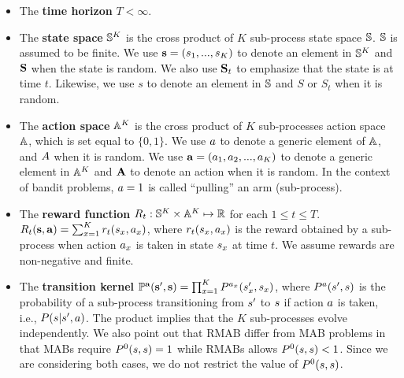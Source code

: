 \begin{itemize}
\item The \textbf{time horizon} $T<\infty$.

\item The \textbf{state space} $\mathbb{S}^K$ is the cross product of $K$ sub-process state space $\mathbb{S}$. $\mathbb{S}$ is assumed to be finite. We use $\mathbf{s}=(s_1,...,s_K)$ to denote an element in $\mathbb{S}^K$ and $\mathbf{S}$ when the state is random. We also use $\mathbf{S}_t$ to emphasize that the state is at time $t$. 
Likewise, we use $s$ to denote an element in $\mathbb{S}$ and $S$ or $S_t$ when it is random. 

\item The \textbf{action space} $\mathbb{A}^K$ is the cross product of $K$ sub-processes action space $\mathbb{A}$, which is set equal to $\{0,1\}$. We use $a$ to denote a generic element of $\mathbb{A}$, and $A$ when it is random. We use $\mathbf{a}=(a_1,a_2,...,a_K)$ to denote a generic element in $\mathbb{A}^K$ and $\mathbf{A}$ to denote an action when it is random. In the context of bandit problems, $a=1$ is called ``pulling'' an arm (sub-process).
\item The \textbf{reward function} $R_t:\mathbb{S}^K \times \mathbb{A}^K\mapsto \mathbb{R}$ for each $1\leq t\leq T$. $R_t(\mathbf{s},\mathbf{a}) = \sum_{x=1}^K r_t(s_x,a_x)$, where  $r_t(s_x,a_x)$ is the reward obtained by a sub-process when action $a_x$ is taken in state $s_x$ at time $t$. We assume rewards are non-negative and finite. 

\item The \textbf{transition kernel} $\mathbb{P}^{\mathbf{a}}(\mathbf{s}',\mathbf{s}) = \prod_{x=1}^{K}P^{a_x}(s'_x,s_x)$, where $P^{a}(s',s)$ is the probability of a sub-process transitioning from $s'$ to $s$ if action $a$ is taken, i.e., $P(s|s',a)$. The product implies that the $K$ sub-processes evolve independently. We also point out that RMAB differ from MAB problems in that MABs require $P^0(s,s)=1$ while RMABs allows $P^0(s,s)<1$. Since we are considering both cases, we do not restrict the value of $P^0(s,s)$.
\end{itemize}


